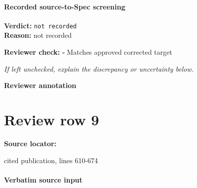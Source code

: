 \documentclass[10pt]{article}
\newcommand{\reviewerbox}{%
  \par\noindent\fbox{\parbox{0.96\linewidth}{\rule{0pt}{0.38in}}}\par
}
\newcommand{\reviewmatch}[1]{%
  \par\noindent\textbf{Reviewer check:} $\square$\; #1\par
  \noindent\emph{If left unchecked, explain the discrepancy or uncertainty below.}\par
}
\begin{document}
\paragraph{Recorded source-to-Spec screening}
\textbf{Verdict:} \texttt{not recorded}
\\
\textbf{Reason:} not recorded
\reviewmatch{Matches approved corrected target}
\noindent\textbf{Reviewer annotation}\par
\reviewerbox
\clearpage
\hypertarget{source-claim-1113264c00211bf2}{}
\section*{Review row 9}
\textbf{Source locator:} {\footnotesize\raggedright cited publication, lines 610-\allowbreak{}674\par}
\paragraph{Verbatim source input}
\end{document}
